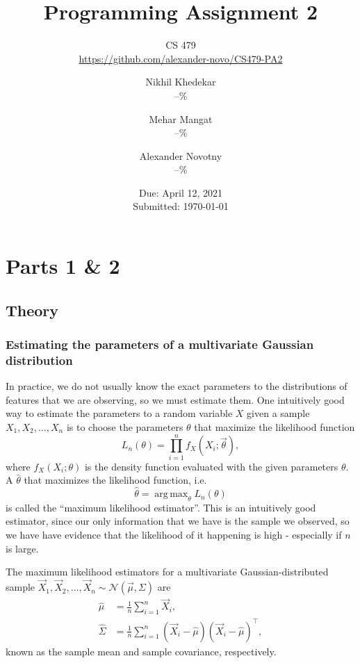 \documentclass[headings=optiontoheadandtoc,listof=totoc,parskip=full]{scrartcl}
\title{Programming Assignment 2}
\subtitle{CS 479\\\url{https://github.com/alexander-novo/CS479-PA2}}
\author{Nikhil Khedekar\\--\% \and Mehar Mangat\\--\% \and Alexander Novotny\\--\%}
\date{Due: April 12, 2021 \\ Submitted: \today}
\DeclareMathOperator*{\argmax}{arg\,max}
\begin{document}
\maketitle
\tableofcontents
{}

\newpage
{}

\section{Parts 1 \& 2}
\label{sec:part-1}

\subsection{Theory}

\subsubsection{Estimating the parameters of a multivariate Gaussian distribution}
\label{sec:theory-estimators}

In practice, we do not usually know the exact parameters to the distributions of features that we are observing, so we must estimate them. One intuitively good way to estimate the parameters to a random variable $X$ given a sample $X_1, X_2, \dots, X_n$ is to choose the parameters $\theta$ that maximize the likelihood function
\begin{equation}
	L_n(\theta) = \prod_{i = 1}^n f_X(X_i; \vec \theta),
\end{equation}
where $f_X(X_i; \theta)$ is the density function evaluated with the given parameters $\theta$. A $\hat \theta$ that maximizes the likelihood function, i.e.
\[
	\hat \theta = \argmax_\theta L_n(\theta)
\]
is called the ``maximum likelihood estimator''. This is an intuitively good estimator, since our only information that we have is the sample we observed, so we have have evidence that the likelihood of it happening is high - especially if $n$ is large.

The maximum likelihood estimators for a multivariate Gaussian-distributed sample $\vec X_1, \vec X_2, \dots, \vec X_n \sim \mathcal N(\vec \mu, \Sigma)$ are
\begin{align*}
	\hat \mu &= \frac{1}{n} \sum_{i = 1}^n \vec X_i,\\
	\hat \Sigma &= \frac{1}{n} \sum_{i = 1}^n (\vec X_i - \hat \mu)(\vec X_i - \hat \mu)^\top,
\end{align*}
known as the sample mean and sample covariance, respectively.
\end{document}
